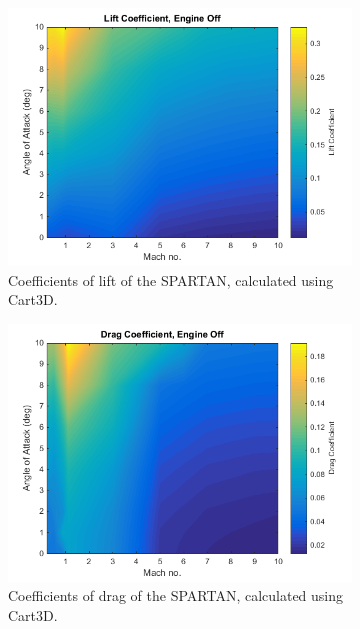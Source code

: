 \begin{figure}[ht]
	\begin{subfigure}{.5\textwidth}
		\centering
		\includegraphics[width=0.99\linewidth]{figures/3_vehicle_design/Cl}
		\caption{Coefficients of lift of the SPARTAN, calculated using Cart3D.}
		\label{fig:Cl}
	\end{subfigure}
	\begin{subfigure}{.5\textwidth}
		\centering
		\includegraphics[width=0.99\linewidth]{figures/3_vehicle_design/Cd}
		\caption{Coefficients of drag of the SPARTAN, calculated using Cart3D.}
		\label{fig:Cd}
	\end{subfigure}
	\begin{subfigure}{.5\textwidth}
		\centering

\end{subfigure}
\end{figure}
